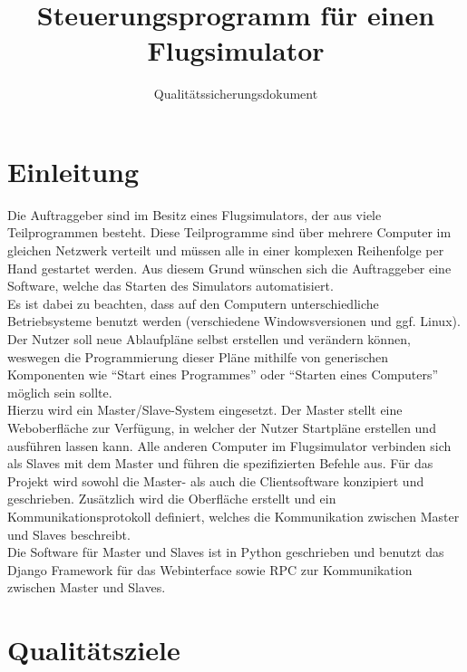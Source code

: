 \documentclass[accentcolor=tud9c,12pt,paper=a4]{tudreport}
\title{Steuerungsprogramm für einen Flugsimulator}
\subtitle{Qualitätssicherungsdokument}
\begin{document}
	\maketitle
	\tableofcontents

	\chapter{Einleitung}
		Die Auftraggeber sind im Besitz eines Flugsimulators, der aus viele
		Teilprogrammen besteht. Diese Teilprogramme sind über mehrere Computer im
		gleichen Netzwerk verteilt und müssen alle in einer komplexen Reihenfolge per Hand
		gestartet werden. Aus diesem Grund wünschen sich die Auftraggeber eine Software, welche
		das Starten des Simulators automatisiert.\\[5pt]
		Es ist dabei zu beachten, dass auf den Computern unterschiedliche
		Betriebsysteme benutzt werden (verschiedene Windowsversionen und ggf. Linux).
		Der Nutzer soll neue Ablaufpläne selbst erstellen und verändern können,
		weswegen die Programmierung dieser Pläne mithilfe von generischen Komponenten
		wie "`Start eines Programmes"' oder "`Starten eines Computers"' möglich sein sollte.
		\\[5pt]
		Hierzu wird ein Master/Slave-System eingesetzt. Der Master stellt eine Weboberfläche zur
		Verfügung, in welcher der Nutzer Startpläne erstellen und ausführen lassen kann.
		Alle anderen Computer im Flugsimulator verbinden sich als Slaves mit dem Master und
		führen die spezifizierten Befehle aus.
		Für das Projekt wird sowohl die Master- als auch die Clientsoftware
		konzipiert und geschrieben. Zusätzlich wird die Oberfläche erstellt und ein
		Kommunikationsprotokoll definiert, welches die Kommunikation zwischen
		Master und Slaves beschreibt.
		\\[5pt]
		Die Software für Master und Slaves ist in Python geschrieben und benutzt
		das Django Framework für das Webinterface sowie RPC zur Kommunikation zwischen
		Master und Slaves.


	\chapter{Qualitätsziele}
\end{document}
